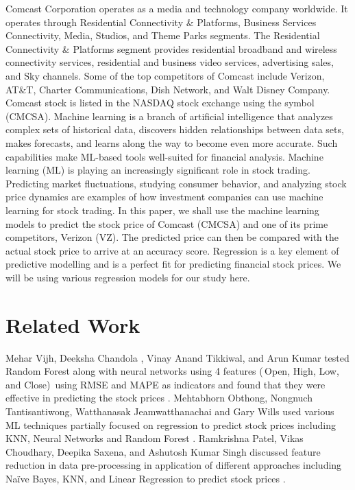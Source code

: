 \documentclass[conference]{IEEEtran}
\begin{document}
Comcast Corporation operates as a media and technology company worldwide.
It operates through Residential Connectivity \& Platforms, Business Services Connectivity, Media, Studios, and Theme Parks segments.
The Residential Connectivity \& Platforms segment provides residential broadband and wireless connectivity services, residential and business video services, advertising sales, and Sky channels. Some of the top competitors of Comcast include Verizon, AT\&T, Charter Communications, Dish Network, and Walt Disney Company.
Comcast stock is listed in the NASDAQ stock exchange using the symbol (CMCSA).
Machine learning is a branch of artificial intelligence that analyzes complex sets of historical data, discovers hidden relationships between data sets, makes forecasts, and learns along the way to become even more accurate.
Such capabilities make ML-based tools well-suited for financial analysis.
Machine learning (ML) is playing an increasingly significant role in stock trading.
Predicting market fluctuations, studying consumer behavior, and analyzing stock price dynamics are examples of how investment companies can use machine learning for stock trading.
In this paper, we shall use the machine learning models to predict the stock price of Comcast (CMCSA) and one of its prime competitors, Verizon (VZ).
The predicted price can then be compared with the actual stock price to arrive at an accuracy score. Regression is a key element of predictive modelling and is a perfect fit for predicting financial stock prices.
We will be using various regression models for our study here.

\section{Related Work}

Mehar Vijh, Deeksha Chandola , Vinay Anand Tikkiwal, and Arun Kumar tested Random Forest along with neural networks using 4 features (\,Open, High, Low, and Close)\, using RMSE and MAPE as indicators and found that they were effective in predicting the stock prices \cite{b3}.
Mehtabhorn Obthong, Nongnuch Tantisantiwong, Watthanasak Jeamwatthanachai and Gary Wills used various ML techniques partially focused on regression to predict stock prices including KNN, Neural Networks and Random Forest \cite{b4}.
Ramkrishna Patel, Vikas Choudhary, Deepika Saxena, and Ashutosh Kumar Singh discussed feature reduction in data pre-processing in application of different approaches including Naïve Bayes, KNN, and Linear Regression to predict stock prices \cite{b5}.
\end{document}
